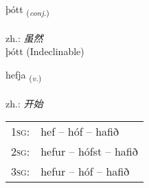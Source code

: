 \documentclass[frontgrid, backgrid]{flacards}\usepackage[]{graphicx}\usepackage[]{xcolor}
\begin{document}
\renewcommand{\flhead}{\vskip5pt \fboxsep=0pt {\small\bfseries\footnotesize Samtenging | 连词}}
\renewcommand{\fcfoot}{\vskip5pt \fboxsep=0pt \hspace{2pt}{\small\bfseries\footnotesize 1K}}

\renewcommand{\blhead}{\vskip5pt {\small\bfseries\footnotesize Samtenging | 连词 }}
\renewcommand{\bcfoot}{\vskip5pt \hspace{2pt}{\small\bfseries\footnotesize 1K}}


{þótt \small{\textsubscript{(\textit{conj.})}} \\[1ex]
\textphonetic{[θouht]} \\
zh.: \emph{虽然} \\  [2ex]
þótt (Indeclinable)}

\renewcommand{\flhead}{\vskip5pt \fboxsep=0pt {\small\bfseries\footnotesize Sagnorð | 动词}}
\renewcommand{\fcfoot}{\vskip5pt \fboxsep=0pt \hspace{2pt}{\small\bfseries\footnotesize 1K}}

\renewcommand{\blhead}{\vskip5pt {\small\bfseries\footnotesize Sagnorð | 动词 }}
\renewcommand{\bcfoot}{\vskip5pt \hspace{2pt}{\small\bfseries\footnotesize 1K}}


{hefja \small{\textsubscript{(\textit{v.})}} \\[1ex] %
\textphonetic{[hɛvja]} \\
zh.: \emph{开始} \\  [2ex]
\renewcommand*{\arraystretch}{0.8}
\begin{tabular}{p{1cm}l}
\textsc{1sg}: & hef -- hóf -- hafið \\ 
\textsc{2sg}: & hefur -- hófst -- hafið \\ 
\textsc{3sg}: & hefur -- hóf -- hafið \\ 
\end{tabular}
}


\renewcommand{\flhead}{\vskip5pt \fboxsep=0pt {\small\bfseries\footnotesize Samtenging | 连词}}
\renewcommand{\fcfoot}{\vskip5pt \fboxsep=0pt \hspace{2pt}{\small\bfseries\footnotesize 1K}}
\end{document}

